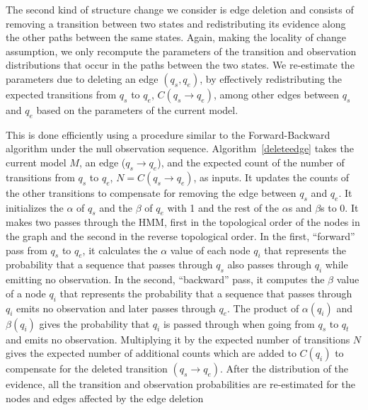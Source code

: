 \documentclass[letterpaper]{article}
\begin{document}

The second kind of structure change we consider is edge deletion and consists of removing a transition between two states and 
redistributing its evidence along the other paths between the same states. 
Again, making the locality of change assumption, we only recompute 
the parameters of the transition and observation distributions 
that occur in the paths between the two states.
We re-estimate the parameters due to deleting an edge $(q_s,q_e)$,
by effectively redistributing the expected transitions from 
$q_s$ to $q_e$, $C(q_s \rightarrow q_e)$,
among other edges between $q_s$ and $q_e$ based on the parameters of the current model. 

This is done efficiently using a procedure similar to the 
Forward-Backward algorithm under the null observation sequence.
Algorithm~\ref{deleteedge} takes the current model $M$, an edge 
($q_s \rightarrow q_e$), and the expected count of the number of transitions 
from $q_s$ to $q_e$, $N = C(q_s \rightarrow q_e)$,  
as inputs. It updates the counts of 
the other transitions to compensate for removing the edge between 
$q_s$ and $q_e$. It initializes the $\alpha$ of $q_s$ and the $\beta$ 
of $q_e$ with 1 and the rest of the $\alpha$s and $\beta$s to $0$. 
It makes two passes through the HMM, 
first in the topological order of the nodes in the graph and the second 
in the reverse topological order. In the first, ``forward'' pass
from $q_s$ to $q_e$, 
it calculates  the $\alpha$ value of each node $q_i$ 
that represents the probability that a sequence that 
passes through $q_s$ also passes through $q_i$ 
while emitting no observation. In the second, ``backward'' pass,
it computes the $\beta$ value of a node $q_i$ 
that represents the probability that a sequence that passes
through 
$q_i$ emits no observation and later 
passes through $q_e$. The product of 
$\alpha(q_i)$ and $\beta(q_i)$ gives the probability that 
$q_i$ is passed through when going from $q_s$ to $q_t$ and emits
no observation. Multiplying it by the 
expected number of transitions $N$ gives the 
expected number of additional counts %
which are added to $C(q_i)$ 
to compensate for the deleted transition $(q_s \rightarrow q_e)$.
After the distribution of the evidence, 
all the transition and observation probabilities are re-estimated for
the nodes and edges affected by the edge deletion 
\end{document}

